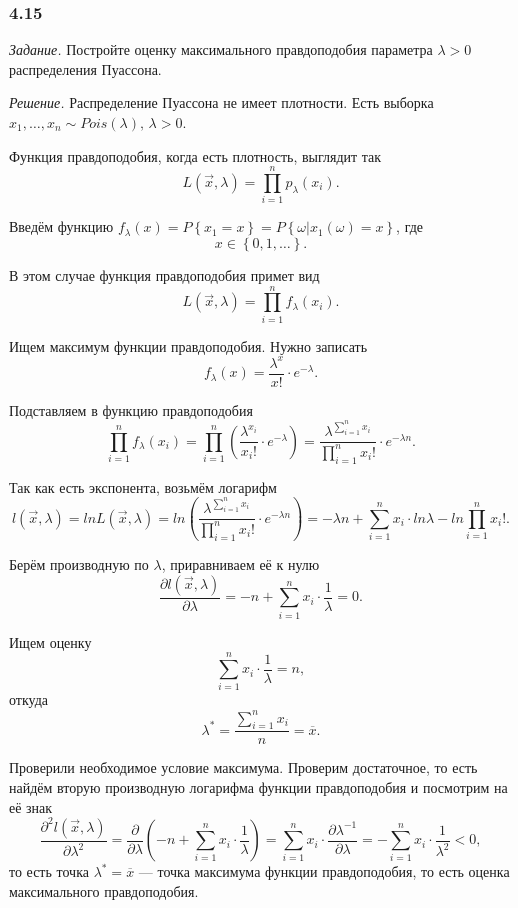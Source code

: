 \subsubsection*{4.15}

\textit{Задание.}
Постройте оценку максимального правдоподобия параметра $ \lambda > 0$ распределения Пуассона.

\textit{Решение.} Распределение Пуассона не имеет плотности.
Есть выборка $x_1, \dotsc, x_n \sim Pois \left( \lambda \right), \, \lambda > 0$.

Функция правдоподобия, когда есть плотность, выглядит так
$$L \left( \vec{x}, \lambda \right) =
  \prod \limits_{i = 1}^n p_{ \lambda } \left( x_i \right).$$

Введём функцию
$f_{ \lambda } \left( x \right) =
  P \left\{ x_1 = x \right\} =
  P \left\{ \left. \omega \right| x_1 \left( \omega \right) = x \right\} $,
где
$$x \in
  \left\{ 0, 1, \dotsc \right\}.$$

В этом случае функция правдоподобия примет вид
$$L \left( \vec{x}, \lambda \right) =
  \prod \limits_{i = 1}^n f_{ \lambda } \left( x_i \right).$$

Ищем максимум функции правдоподобия.
Нужно записать
$$f_{ \lambda } \left( x \right) =
  \frac{ \lambda^x}{x!} \cdot e^{- \lambda }.$$

Подставляем в функцию правдоподобия
$$ \prod \limits_{i = 1}^n f_{ \lambda } \left( x_i \right) =
  \prod \limits_{i = 1}^n \left( \frac{ \lambda^{x_i}}{x_i!} \cdot e^{- \lambda } \right) =
  \frac{ \lambda^{ \sum \limits_{i = 1}^n x_i}}{ \prod \limits_{i = 1}^n x_i!} \cdot
  e^{- \lambda n}.$$

Так как есть экспонента, возьмём логарифм
$$l \left( \vec{x}, \lambda \right) =
  ln L \left( \vec{x}, \lambda \right) =
  ln \left(
    \frac{ \lambda^{ \sum \limits_{i = 1}^n x_i}}{ \prod \limits_{i = 1}^n x_i!} \cdot
    e^{- \lambda n}
  \right) =
  - \lambda n + \sum \limits_{i = 1}^n x_i \cdot ln \lambda - ln \prod \limits_{i = 1}^n x_i!.$$

Берём производную по $ \lambda $, приравниваем её к нулю
$$ \frac{ \partial l \left( \vec{x}, \lambda \right) }{ \partial \lambda } =
  -n + \sum \limits_{i = 1}^n x_i \cdot \frac{1}{ \lambda } =
  0.$$

Ищем оценку
$$ \sum \limits_{i = 1}^n x_i \cdot \frac{1}{ \lambda } =
  n,$$
откуда
$$ \lambda^* =
  \frac{ \sum \limits_{i = 1}^n x_i}{n} =
  \overline{x}.$$

Проверили необходимое условие максимума.
Проверим достаточное,
то есть найдём вторую производную логарифма функции правдоподобия и посмотрим на её знак
$$ \frac{ \partial^2 l \left( \vec{x}, \lambda \right) }{ \partial \lambda^2} =
  \frac{ \partial }{ \partial \lambda } \left(
    -n + \sum \limits_{i = 1}^n x_i \cdot \frac{1}{ \lambda }
  \right) =
  \sum \limits_{i = 1}^n x_i \cdot \frac{ \partial \lambda^{-1}}{ \partial \lambda } =
  - \sum \limits_{i = 1}^n x_i \cdot \frac{1}{ \lambda^2} <
  0,$$
то есть точка $ \lambda^* = \overline{x}$ --- точка максимума функции правдоподобия,
то есть оценка максимального правдоподобия.
